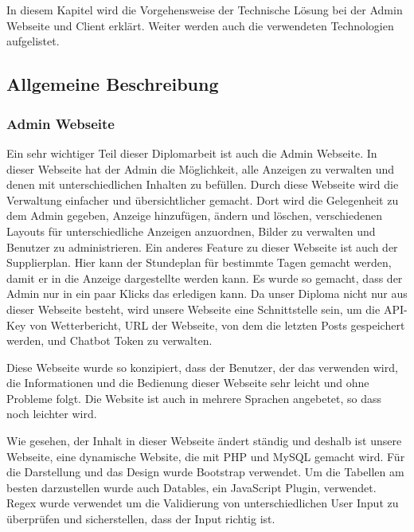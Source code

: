 \chapter{\docname}
\label{\docname}
In diesem Kapitel wird die Vorgehensweise der Technische L\"{o}sung bei der Admin Webseite und Client erkl\"{a}rt. Weiter werden auch die verwendeten Technologien aufgelistet. 

\section{Allgemeine Beschreibung}

\subsection{Admin Webseite}
Ein sehr wichtiger Teil dieser Diplomarbeit ist auch die Admin Webseite. In dieser Webseite hat der Admin die M\"{o}glichkeit, alle Anzeigen zu verwalten und denen mit unterschiedlichen Inhalten zu bef\"{u}llen. Durch diese Webseite wird die Verwaltung einfacher und \"{u}bersichtlicher gemacht. Dort wird die Gelegenheit zu dem Admin gegeben, Anzeige hinzuf\"{u}gen, \"{a}ndern und l\"{o}schen, verschiedenen Layouts f\"{u}r unterschiedliche Anzeigen anzuordnen, Bilder zu verwalten und Benutzer zu administrieren. Ein anderes Feature zu dieser Webseite ist auch der Supplierplan. Hier kann der Stundeplan f\"{u}r bestimmte Tagen gemacht werden, damit er in die Anzeige dargestellte werden kann. Es wurde so gemacht, dass der Admin nur in ein paar Klicks das erledigen kann. Da unser Diploma nicht nur aus dieser Webseite besteht, wird unsere Webseite eine Schnittstelle sein, um die API-Key von Wetterbericht, URL der Webseite, von dem die letzten Posts gespeichert werden, und Chatbot Token zu verwalten.

Diese Webseite wurde so konzipiert, dass der Benutzer, der das verwenden wird, die Informationen und die Bedienung dieser Webseite sehr leicht und ohne Probleme folgt. Die Website ist auch in mehrere Sprachen angebetet, so dass noch leichter wird.

Wie gesehen, der Inhalt in dieser Webseite \"{a}ndert st\"{a}ndig und deshalb ist unsere Webseite, eine dynamische Website, die mit PHP und MySQL gemacht wird. F\"{u}r die Darstellung und das Design wurde Bootstrap verwendet. Um die Tabellen am besten darzustellen wurde auch Datables, ein JavaScript Plugin, verwendet. Regex wurde verwendet um die Validierung von unterschiedlichen User Input zu \"{u}berpr\"{u}fen und sicherstellen, dass der Input richtig ist.
 

